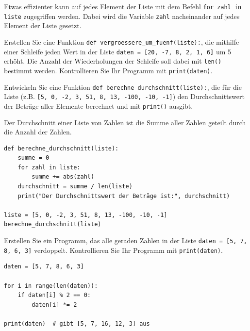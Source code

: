 \begin{myexample}
Etwas effizienter kann auf jedes Element der Liste mit dem Befehl \lstinline|for zahl in liste| zugegriffen werden. Dabei wird die Variable \lstinline|zahl| nacheinander auf jedes Element der Liste gesetzt.

\end{myexample}

\begin{myexercise}
    Erstellen Sie eine Funktion \lstinline|def vergroessere_um_fuenf(liste):|, die mithilfe einer Schleife jeden Wert in der Liste \lstinline|daten = [20, -7, 8, 2, 1, 6]| um 5 erhöht. Die Anzahl der Wiederholungen der Schleife soll dabei mit \lstinline|len()| bestimmt werden. Kontrollieren Sie Ihr Programm mit \lstinline|print(daten)|.

    \begin{myanswer}

    \end{myanswer}
\end{myexercise}

\begin{myexercise}
    Entwickeln Sie eine Funktion \lstinline|def berechne_durchschnitt(liste):|, die für die Liste (z.B. \lstinline|[5, 0, -2, 3, 51, 8, 13, -100, -10, -1]|) den Durchschnittswert der Beträge aller Elemente berechnet und mit \lstinline|print()| ausgibt.

    Der Durchschnitt einer Liste von Zahlen ist die Summe aller Zahlen geteilt durch die Anzahl der Zahlen.
    \begin{myanswer}
        \begin{lstlisting}
def berechne_durchschnitt(liste):
    summe = 0
    for zahl in liste:
        summe += abs(zahl)
    durchschnitt = summe / len(liste)
    print("Der Durchschnittswert der Beträge ist:", durchschnitt)

liste = [5, 0, -2, 3, 51, 8, 13, -100, -10, -1]
berechne_durchschnitt(liste)
\end{lstlisting}
    \end{myanswer}
\end{myexercise}

\begin{myexercise}
    Erstellen Sie ein Programm, das alle geraden Zahlen in der Liste \lstinline|daten = [5, 7, 8, 6, 3]| verdoppelt. Kontrollieren Sie Ihr Programm mit \lstinline|print(daten)|.

    \begin{myanswer}
        \begin{lstlisting}
daten = [5, 7, 8, 6, 3]

for i in range(len(daten)):
    if daten[i] % 2 == 0:
        daten[i] *= 2

print(daten)  # gibt [5, 7, 16, 12, 3] aus
\end{lstlisting}
    \end{myanswer}
\end{myexercise}

